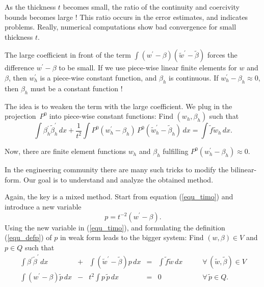 As the thickness $t$ becomes small, the ratio of the continuity and coercivity 
bounds becomes large ! This ratio occurs in the error estimates, and indicates 
problems. Really, numerical computations show bad convergence for small thickness $t$.

The large coefficient in front of the term $\int (w^\prime - \beta) (\tilde w^\prime - \tilde \beta)$ forces the difference $w^\prime - \beta$ to be small. If we use piece-wise linear
finite elements for $w$ and $\beta$, then $w_h^\prime$ is a piece-wise constant function,
and $\beta_h$ is continuous. If $w_h^\prime - \beta_h \approx 0$, then $\beta_h$ must
be a constant function !

\bigskip

The idea is to weaken the term with the large coefficient. We plug in the 
projection~$P^0$ into piece-wise constant functions: Find $(w_h, \beta_h)$ such that
\begin{equation} \label{equ_timo_h}
\int \beta_h^\prime \tilde \beta_h^\prime \, dx + \frac{1}{t^2} \int P^0 (w_h^\prime - \beta_h) \, P^0 (\tilde w_h^\prime - \tilde \beta_h) \, dx = \int \tilde f \tilde w_h \, dx.
\end{equation}

Now, there are finite element functions $w_h$ and $\beta_h$ fulfilling $P^0 (w_h^\prime - \beta_h) \approx 0$. 

In the engineering community there are many such tricks to modify the bilinear-form.
Our goal is to understand and analyze the obtained method. 


\bigskip

Again, the key is a mixed method. Start from equation (\ref{equ_timo}) and introduce a
new variable
\begin{equation} \label{equ_defp}
p = t^{-2} (w^\prime - \beta).
\end{equation}
Using the new variable in (\ref{equ_timo}), and formulating the definition (\ref{equ_defp})
of $p$ in weak form
leads to the bigger system: Find $(w,\beta) \in V$ and $p \in Q$ such that
\begin{equation} \label{equ_timo_mixed}
\begin{array}{ccccll}
\int \beta^\prime \tilde \beta^\prime \, dx & + & \int (\tilde
                                                  w^\prime - \tilde \beta) p \, dx & = &
\int \tilde f \tilde w \, dx \qquad & \forall \, (\tilde w, \tilde \beta) \in V  \\[0.5em]
\int (w^\prime - \beta) \tilde p \, dx & - & t^2 \int p \, \tilde p \, dx & = & 0 & 
\forall \, \tilde p \in Q.
\end{array}
\end{equation}

